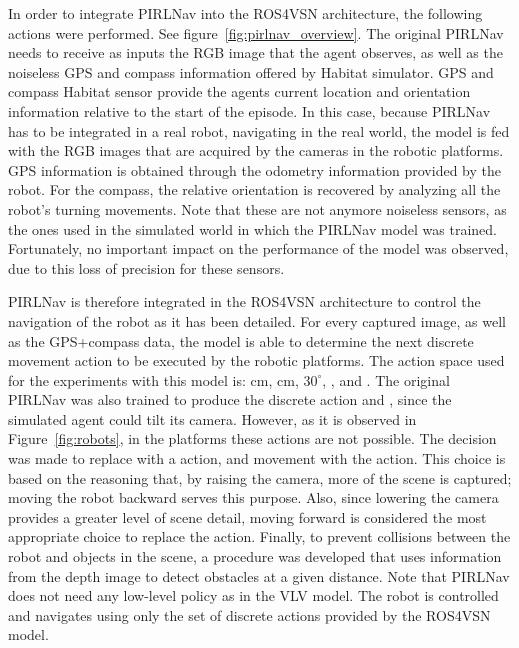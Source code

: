In order to integrate PIRLNav into the ROS4VSN architecture, the following actions were performed.
See figure~\ref{fig:pirlnav_overview}.
The original PIRLNav needs to receive as inputs the RGB image that the agent observes, as well as the noiseless GPS and compass information offered by Habitat simulator.
GPS and compass Habitat sensor provide the agent\textquotesingle s current location and orientation information relative to the start of the episode.
In this case, because PIRLNav has to be integrated in a real robot, navigating in the real world, the model is fed with the RGB images that are acquired by the cameras in the robotic platforms.
GPS information is obtained through the odometry information provided by the robot.
For the compass, the relative orientation is recovered by analyzing all the robot's turning movements.
Note that these are not anymore noiseless sensors, as the ones used in the simulated world in which the PIRLNav model was trained.
Fortunately, no important impact on the performance of the model was observed, due to this loss of precision for these sensors.

PIRLNav is therefore integrated in the ROS4VSN architecture to control the navigation of the robot as it has been detailed.
For every captured image, as well as the GPS+compass data, the model is able to determine the next discrete movement action to be executed by the robotic platforms.
The action space used for the experiments with this model is:  cm,  cm, \turnright $30^\circ$, \turnleft, and \stopac.
The original PIRLNav was also trained to produce the discrete action \lookup and \lookdown, since the simulated agent could tilt its camera.
However, as it is observed in Figure~\ref{fig:robots}, in the platforms these actions are not possible.
The decision was made to replace \lookup with a \movebackward action, and \lookdown movement with the \moveforward action.
This choice is based on the reasoning that, by raising the camera, more of the scene is captured; moving the robot backward serves this purpose.
Also, since lowering the camera provides a greater level of scene detail, moving forward is considered the most appropriate choice to replace the \lookdown action.
Finally, to prevent collisions between the robot and objects in the scene, a procedure was developed that uses information from the depth image to detect obstacles at a given distance.
Note that PIRLNav does not need any low-level policy as in the VLV model.
The robot is controlled and navigates using only the set of discrete actions provided by the ROS4VSN model.




